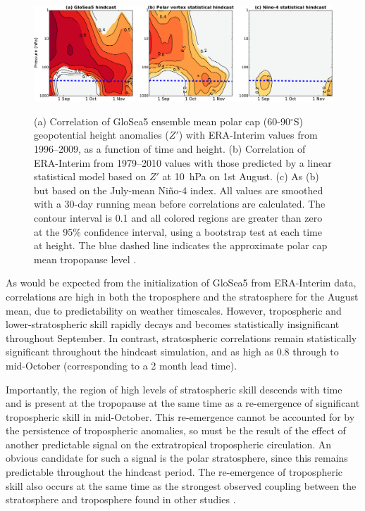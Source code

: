 \begin{figure}[t]
  \noindent\includegraphics[width=\textwidth,angle=0]{figures/chapter-seasonal/lag_corr_crop.pdf}\\
  \caption[Lag-height correlation of GloSea5 polar cap geopotential height]{(a)
    Correlation of GloSea5 ensemble mean polar cap (60-90$^{\circ}$S)
    geopotential height anomalies ($Z'$) with ERA-Interim values from
    1996--2009, as a function of time and height. (b) Correlation of ERA-Interim
    from 1979--2010 values with those predicted by a linear statistical model
    based on $Z'$ at 10~hPa on 1st August. (c) As (b) but based on the July-mean
    Ni\~no-4 index. All values are smoothed with a 30-day running mean before
    correlations are calculated. The contour interval is 0.1 and all colored
    regions are greater than zero at the 95\% confidence interval, using a
    bootstrap test at each time at height. The blue dashed line indicates the
    approximate polar cap mean tropopause level
    \citep{Wilcox2012}.} \label{fig:gph_lag_corr}
\end{figure}


As would be expected from the initialization of GloSea5 from ERA-Interim data,
correlations are high in both the troposphere and the stratosphere for the
August mean, due to predictability on weather timescales. However, tropospheric
and lower-stratospheric skill rapidly decays and becomes statistically
insignificant throughout September. In contrast, stratospheric correlations
remain statistically significant throughout the hindcast simulation, and as high
as 0.8 through to mid-October (corresponding to a 2 month lead time). 

Importantly, the region of high levels of stratospheric skill descends with time
and is present at the tropopause at the same time as a re-emergence of
significant tropospheric skill in mid-October. This re-emergence cannot be
accounted for by the persistence of tropospheric anomalies, so must be the
result of the effect of another predictable signal on the extratropical
tropospheric circulation. An obvious candidate for such a signal is the polar
stratosphere, since this remains predictable throughout the hindcast period. The
re-emergence of tropospheric skill also occurs at the same time as the strongest
observed coupling between the stratosphere and troposphere found in other
studies \citep[e.g.,][]{Thompson2005, Simpson2011}.

